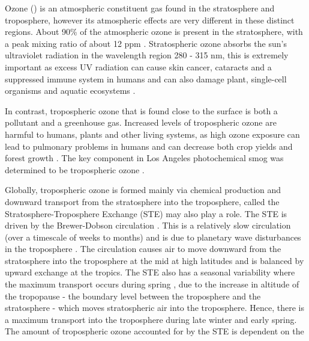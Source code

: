 Ozone () is an atmospheric constituent gas found in the stratosphere and troposphere, however its atmospheric effects 
are very different in these distinct regions. About 90\% of the atmospheric ozone is present in the stratosphere, with a peak 
mixing ratio of about 12 ppm \citep{Seinfeld:2006}. Stratospheric ozone absorbs the sun's ultraviolet radiation in the 
wavelength region 280 - 315 nm, this is extremely important as excess UV radiation can cause skin cancer, cataracts and a 
suppressed immune system in humans and can also damage plant, single-cell organisms and aquatic ecosystems \citep{WMO:2010}. 

In contrast, tropospheric ozone that is found close to the surface is both a pollutant and a greenhouse gas. Increased levels 
of tropospheric ozone are harmful to humans, plants and other living systems, as high ozone exposure can lead to pulmonary 
problems in humans and can decrease both crop yields and forest growth \citep{WMO:2010}. The key component in Los Angeles 
photochemical smog was determined to be tropospheric ozone \citep{Haagen-Smit:1956}. 

Globally, tropospheric ozone is formed mainly via chemical production and downward transport from the stratosphere into the 
troposphere, called the Stratosphere-Troposphere Exchange (STE) may also play a role. The STE is driven by the Brewer-Dobson 
circulation \citep{Brewer:1949, Dobson:1956}.  This is a relatively slow circulation (over a timescale of weeks to months) and is
due to planetary wave disturbances in the troposphere \citep{Haynes:1991}. The circulation causes air to move downward from the 
stratosphere into the troposphere at the mid at high latitudes and is balanced by upward exchange at the tropics. The STE also 
has a seasonal variability where the maximum transport occurs during spring \citep{Appenzeller:1996}, due to the increase in 
altitude of the tropopause - the boundary level between the troposphere and the stratosphere - which moves stratospheric air 
into the troposphere. Hence, there is a maximum  transport into the troposphere during late winter and early spring.
The amount of tropospheric ozone accounted for by the STE is dependent on the  %


